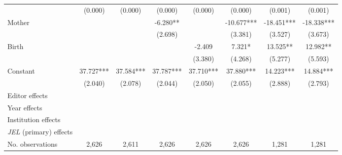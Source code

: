 \begin{table}
\begin{adjustwidth}{-0.085cm}{}
\begin{threeparttable}
\begin{tabular}{p{2.64cm}SSSSSSS}
                                          &     (0.000)   &     (0.000)   &     (0.000)   &     (0.000)   &     (0.000)   &     (0.001)   &     (0.001)   \\
            Mother                        &               &               &      -6.280** &               &     -10.677***&     -18.451***&     -18.338***\\
                                          &               &               &     (2.698)   &               &     (3.381)   &     (3.527)   &     (3.673)   \\
            Birth                         &               &               &               &      -2.409   &       7.321*  &      13.525** &      12.982** \\
                                          &               &               &               &     (3.380)   &     (4.268)   &     (5.277)   &     (5.593)   \\
            Constant                      &      37.727***&      37.584***&      37.787***&      37.710***&      37.880***&      14.223***&      14.884***\\
                                          &     (2.040)   &     (2.078)   &     (2.044)   &     (2.050)   &     (2.055)   &     (2.888)   &     (2.793)   \\
            \midrule
            Editor effects                &           {}   &           {}   &           {}   &           {}   &           {}   &           {}   &           {}   \\
            Year effects                  &           {}   &           {}   &           {}   &           {}   &           {}   &           {}   &           {}   \\
            Institution effects           &           {}   &           {}   &           {}   &           {}   &           {}   &           {}   &           {}   \\
            \textit{JEL} (primary) effects&               &               &               &               &               &               &           {}   \\
            No. observations              &       2,626   &       2,611   &       2,626   &       2,626   &       2,626   &       1,281   &       1,281   \\

\end{tabular}
\end{threeparttable}
\end{adjustwidth}
\end{table}
